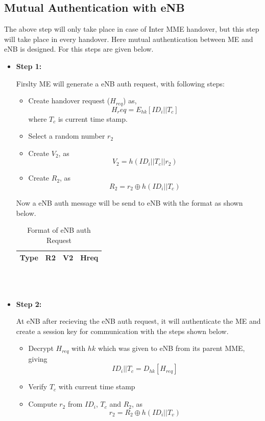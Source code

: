 \subsection{Mutual Authentication with eNB}{
    The above step will only take place in case of Inter MME handover, but this 
    step will take place in every handover. Here mutual authentication between 
    ME and eNB is designed. For this steps are given below.
    \begin{itemize}
        \item \textbf{Step 1: }{
            Firslty ME will generate a eNB auth request, with following steps:
            \begin{itemize}
                \item Create handover request (\(H_{req}\)) as, \[H_req = E_{hk}[ID_i||T_c]\] where \(T_c\) is current time stamp.
                \item Select a random number \(r_2\)
                \item Create \(V_2\), as \[V_2 = h(ID_i||T_c||r_2)\]
                \item Create \(R_2\), as \[R_2 = r_2 \oplus h(ID_i||T_c)\]
            \end{itemize}
            Now a eNB auth message will be send to eNB with the format as shown below.
            \begin{table}[ht]
                \centering
                \begin{tabular}{|c|c|c|c|}
                    \hline
                    Type & R2 & V2 & Hreq\\
                    \hline
                \end{tabular}
                \caption{Format of eNB auth Request}
            \end{table}
        }
        \\\\
        \item \textbf{Step 2: }{
            At eNB after recieving the eNB auth request, it will authenticate the ME and create a session key for communication with the steps shown below.
            \begin{itemize}
                \item Decrypt \(H_{req}\) with \(hk\) which was given to eNB from its parent MME, giving \[ID_i||T_c = D_{hk}[H_{req}]\]
                \item Verify \(T_c\) with current time stamp
                \item Compute \(r_2\) from \(ID_i\), \(T_c\) and \(R_2\), as \[r_2 = R_2 \oplus h(ID_i||T_v)\]

\end{itemize}}
\end{itemize}}
